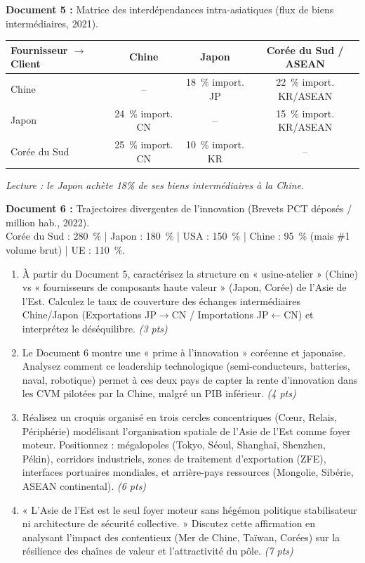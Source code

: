 \documentclass[11pt]{article}
\begin{document}
\begin{exercice}
    \textbf{Document 5 :} Matrice des interdépendances intra-asiatiques (flux de biens intermédiaires, 2021).\\
    \begin{tabular}{lccc}
        \toprule
        Fournisseur $\rightarrow$ Client & Chine & Japon & Corée du Sud / ASEAN \\
        \midrule
        Chine & -- & \SI{18}{\%} import. JP & \SI{22}{\%} import. KR/ASEAN \\
        Japon & \SI{24}{\%} import. CN & -- & \SI{15}{\%} import. KR/ASEAN \\
        Corée du Sud & \SI{25}{\%} import. CN & \SI{10}{\%} import. KR & -- \\
        \bottomrule
    \end{tabular}
    \textit{Lecture : le Japon achète 18\% de ses biens intermédiaires à la Chine.}

    \textbf{Document 6 :} Trajectoires divergentes de l'innovation (Brevets PCT déposés / million hab., 2022).\\
    Corée du Sud : \SI{280}{\%} | Japon : \SI{180}{\%} | USA : \SI{150}{\%} | Chine : \SI{95}{\%} (mais \#1 volume brut) | UE : \SI{110}{\%}.

    \begin{enumerate}
        \item À partir du Document 5, caractérisez la structure en « usine-atelier » (Chine) vs « fournisseurs de composants haute valeur » (Japon, Corée) de l'Asie de l'Est. Calculez le taux de couverture des échanges intermédiaires Chine/Japon (Exportations JP$\rightarrow$CN / Importations JP$\leftarrow$CN) et interprétez le déséquilibre. \textit{(3 pts)}
        \item Le Document 6 montre une « prime à l'innovation » coréenne et japonaise. Analysez comment ce leadership technologique (semi-conducteurs, batteries, naval, robotique) permet à ces deux pays de capter la rente d'innovation dans les CVM pilotées par la Chine, malgré un PIB inférieur. \textit{(4 pts)}
        \item Réalisez un croquis organisé en trois cercles concentriques (Cœur, Relais, Périphérie) modélisant l'organisation spatiale de l'Asie de l'Est comme foyer moteur. Positionnez : mégalopoles (Tokyo, Séoul, Shanghai, Shenzhen, Pékin), corridors industriels, zones de traitement d'exportation (ZFE), interfaces portuaires mondiales, et arrière-pays ressources (Mongolie, Sibérie, ASEAN continental). \textit{(6 pts)}
        \item « L'Asie de l'Est est le seul foyer moteur sans hégémon politique stabilisateur ni architecture de sécurité collective. » Discutez cette affirmation en analysant l'impact des contentieux (Mer de Chine, Taïwan, Corées) sur la résilience des chaînes de valeur et l'attractivité du pôle. \textit{(7 pts)}
    \end{enumerate}
\end{exercice}
\end{document}
